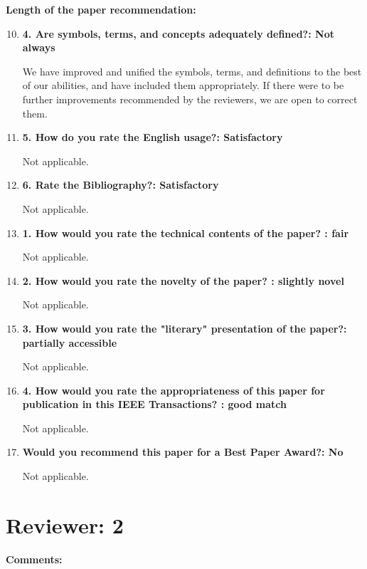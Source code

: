 \documentclass[12pt]{article}
\begin{document}
\textbf{Length of the paper recommendation:}

\begin{enumerate}
\setcounter{enumi}{9}
\item \textbf{4. Are symbols, terms, and concepts adequately defined?: Not always}

We have improved and unified the symbols, terms, and definitions to the best of our 
abilities, and have 
included 
them appropriately.  If there 
were to be further improvements recommended by the reviewers, we are open to correct 
them. 



\item \textbf{5. How do you rate the English usage?: Satisfactory}

Not applicable.

\item \textbf{6. Rate the Bibliography?: Satisfactory}

Not applicable.

\item \textbf{1. How would you rate the technical contents of the paper? : fair}

Not applicable.

\item \textbf{2. How would you rate the novelty of the paper? : slightly novel}

Not applicable.

\item \textbf{3. How would you rate the "literary" presentation of the paper?: partially 
accessible}

Not applicable.

\item \textbf{4. How would you rate the appropriateness of this paper for publication in 
this IEEE Transactions? : good match}

Not applicable.

\item \textbf{Would you recommend this paper for a Best Paper Award?: No}

Not applicable.

\end{enumerate}


\section*{Reviewer: 2}

\textbf{Comments:}
\end{document}
